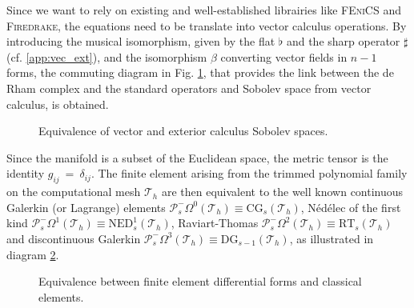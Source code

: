 \documentclass{elsarticle}
\renewcommand\d{\ensuremath{\mathrm{d}}}
\DeclareMathOperator*{\grad}{grad}
\renewcommand{\div}{\operatorname{div}}
\DeclareMathOperator*{\curl}{curl}
\newcommand{\fenics}{\textsc{FEniCS}\xspace}
\newcommand{\firedrake}{\textsc{Firedrake}\xspace}
\begin{document}
Since we want to rely on existing and well-established librairies like \fenics and \firedrake, the equations need to be translate into vector calculus operations. By introducing the musical isomorphism, given by the flat $\flat$ and the sharp operator $\sharp$ (cf. \ref{app:vec_ext}), and the isomorphism $\beta$ converting vector fields in $n-1$ forms, the commuting diagram in Fig. \ref{fig:cd_ext_vec}, that provides the link between the de Rham complex and the standard operators and Sobolev space from vector calculus, is obtained.
\begin{figure}[h]
\centering
{}  
\caption{Equivalence of vector and exterior calculus Sobolev spaces.}
\label{fig:cd_ext_vec}
\end{figure}

Since the manifold is a subset of the Euclidean space, the metric tensor is the identity $g_{ij}~=~\delta_{ij}$. The finite element arising from the trimmed polynomial family on the computational mesh $\mathcal{T}_h$ are then equivalent to the well known continuous Galerkin (or Lagrange) elements $\mathcal{P}^-_s\Omega^0(\mathcal{T}_h) \equiv \mathrm{CG}_s(\mathcal{T}_h)$, Nédélec of the first kind $\mathcal{P}^-_s\Omega^1(\mathcal{T}_h) \equiv \mathrm{NED}_s^1(\mathcal{T}_h)$, Raviart-Thomas $\mathcal{P}^-_s\Omega^2(\mathcal{T}_h) \equiv \mathrm{RT}_s(\mathcal{T}_h)$ and discontinuous Galerkin $\mathcal{P}^-_s\Omega^3(\mathcal{T}_h) \equiv \mathrm{DG}_{s-1}(\mathcal{T}_h)$, as illustrated in  diagram \ref{fig:fe_ext_vec}.

\begin{figure}[h]
\centering
{}  
\caption{Equivalence between finite element differential forms and classical elements.}
\label{fig:fe_ext_vec}
\end{figure}
\end{document}
